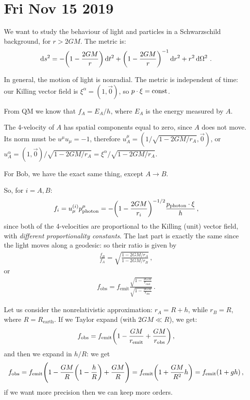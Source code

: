 \documentclass[main.tex]{subfiles}
\begin{document}
\section*{Fri Nov 15 2019}

We want to study the behaviour of light and particles in a Schwarzschild background, for \(r > 2 GM\). The metric is: 
%
\begin{align}
  \dd{s^2} = - \qty(1 - \frac{2GM}{r}) \dd{t^2} 
  + \qty(1 - \frac{2GM}{r})^{-1} \dd{r^2}
  + r^2 \dd{\Omega^2}
\,.
\end{align}

In general, the motion of light is nonradial.
The metric is independent of time: our Killing vector field is \(\xi^{\alpha } = (1, \vec{0} )\), so \(p \cdot \xi = \text{const}\).

From QM we know that \(f_A = E_A / h\), where \(E_A\) is the energy measured by \(A\).

The 4-velocity of \(A\) has spatial components equal to zero, since \(A\) does not move.
Its norm must be  \(u^{\mu } u_{\mu } = -1\), therefore \(u^{\mu }_A = (1/ \sqrt{1 - 2GM / r_A}, \vec{0})\), or \(u^{\alpha}_A = (1, \vec{0}) / \sqrt{1 - 2GM / r_A} = \xi^{\alpha } / \sqrt{1 - 2GM/r_A}\).

For Bob, we have the exact same thing, except \(A \rightarrow B\).

So, for \(i = A, B\): 
%
\begin{align}
  f_i = u_{\mu }^{(i)} p^{\mu }_{ \text{photon}} = - \qty(1 - \frac{2GM}{r_i})^{-1/2} \frac{p _{\text{photon}} \cdot \xi }{h}
\,,
\end{align}
%
since both of the 4-velocities are proportional to the Killing (unit) vector field, with \emph{different proportionality constants}. 
The last part is exactly the same since the light moves along a geodesic: so their ratio is given by
%
\begin{align}
  \frac{f_B}{f_A} = \sqrt{\frac{1-2GM /r_A}{1-2GM/r_B}}
\,,
\end{align}
%
or 
%
\begin{align}
  f _{\text{obs}} = f _{\text{emit}} \frac{\sqrt{1 - \frac{2GM}{r _{\text{emit}}}}}{\sqrt{1 - \frac{2GM}{r _{\text{obs}}}}}
\,.
\end{align}

Let us consider the nonrelativistic approximation: \(r_A = R + h\), while \(r_B = R\), where \(R = R _{\text{earth}}\).
If we Taylor expand (with \(2GM \ll R\)), we get: 
%
\begin{align}
  f _{\text{obs}} = f _{\text{emit}} \qty(1 - \frac{GM}{r _{\text{emit}}} + \frac{GM}{r _{\text{obs}}})
\,,
\end{align}
%
and then we expand in \(h/R\): we get 
%
\begin{align}
    f _{\text{obs}} = f _{\text{emit}} \qty(1 - \frac{GM}{R} \qty(1 - \frac{h}{R}) + \frac{GM}{R}) 
    = f _{\text{emit}} \qty(1 + \frac{GM}{R^2} h)
    = f _{\text{emit}} \qty(1 + g h)
  \,,
\end{align}
%
if we want more precision then we can keep more orders. 
\end{document}
